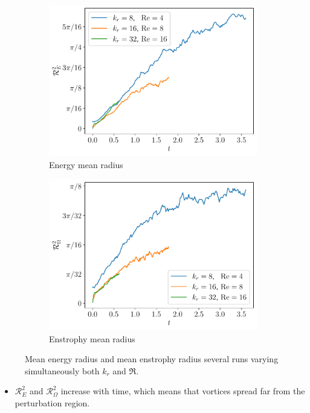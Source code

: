 \documentclass{beamer} %
\begin{document}
\begin{frame}
	\begin{figure}[ht]
		\centering
		\begin{subfigure}{0.44\textwidth}
			\centering
			\includegraphics[width=\textwidth]{../images/EnergyMeanRadius.pdf}
			\caption{Energy mean radius}
		\end{subfigure}\hspace{0.04\textwidth}
		\begin{subfigure}{0.44\textwidth}
			\centering
			\includegraphics[width=\textwidth]{../images/EnstrophyMeanRadius.pdf}
			\caption{Enstrophy mean radius}
		\end{subfigure}
		\caption{Mean energy radius and mean enstrophy radius several runs varying simultaneously both $k_r$ and $\Re$.}
	\end{figure}
	\begin{itemize}
		\item $\mathcal{R}_E^2$ and $\mathcal{R}_\Omega^2$ increase with time, which means that vortices spread far from the perturbation region.
	\end{itemize}
\end{frame}
\end{document}
